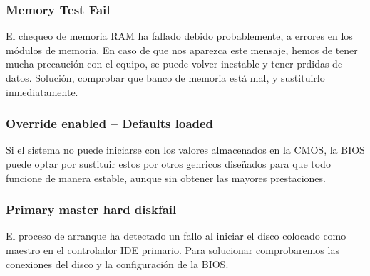 		\subsubsection{Memory Test Fail}

		El chequeo de memoria RAM ha fallado debido probablemente, a
		errores en los módulos de memoria. En caso de que nos aparezca este
		mensaje, hemos de tener mucha precaución con el equipo, se puede
		volver inestable y tener prdidas de datos. Solución, comprobar que
		banco de memoria está mal, y sustituirlo inmediatamente. 

		\subsubsection{Override enabled – Defaults loaded}

		Si el sistema no puede iniciarse con los valores almacenados en la
		CMOS, la BIOS puede optar por sustituir estos por otros genricos
		diseñados para que todo funcione de manera estable, aunque sin
		obtener las mayores prestaciones. 

		\subsubsection{Primary master hard diskfail}

		El proceso de arranque ha detectado un fallo al iniciar el disco
		colocado como maestro en el controlador IDE primario. Para
		solucionar comprobaremos las conexiones del disco y la
		configuración de la BIOS. 

	\newpage
